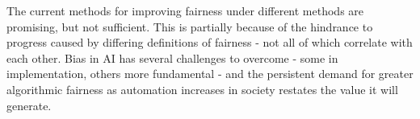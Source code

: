 \documentclass[conference]{IEEEtran}
\begin{document}
The current methods for improving fairness under different methods are promising, but not sufficient. This is partially because of the hindrance to progress caused by differing definitions of fairness - not all of which correlate with each other\cite{friedler2018comparative}. Bias in AI has several challenges to overcome - some in implementation, others more fundamental - and the persistent demand for greater algorithmic fairness as automation increases in society restates the value it will generate.


\end{document}
